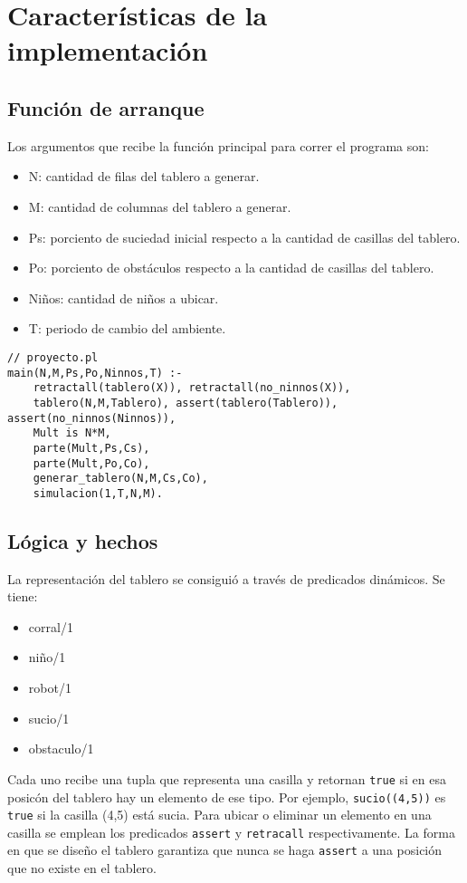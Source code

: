 \documentclass{llncs}
\begin{document}
\section{Caracter\'isticas de la implementaci\'on} 
\subsection{Funci\'on de arranque}

Los argumentos que recibe la funci\'on principal para correr el programa son:
\begin{itemize}
\item N: cantidad de filas del tablero a generar.
\item M: cantidad de columnas del tablero a generar.
\item Ps: porciento de suciedad inicial respecto a la cantidad de casillas del tablero.
\item Po: porciento de obst\'aculos respecto a la cantidad de casillas del tablero.
\item Ni\~nos: cantidad de ni\~nos a ubicar.
\item T: periodo de cambio del ambiente.
\end{itemize}

\begin{lstlisting}
// proyecto.pl
main(N,M,Ps,Po,Ninnos,T) :-
    retractall(tablero(X)), retractall(no_ninnos(X)),
    tablero(N,M,Tablero), assert(tablero(Tablero)), assert(no_ninnos(Ninnos)),
    Mult is N*M,
    parte(Mult,Ps,Cs),
    parte(Mult,Po,Co),
    generar_tablero(N,M,Cs,Co),
    simulacion(1,T,N,M).
\end{lstlisting}

\subsection{L\'ogica y hechos}
La representaci\'on del tablero se consigui\'o a trav\'es de predicados din\'amicos.
Se tiene:
\begin{itemize}
\item corral/1
\item ni\~no/1
\item robot/1
\item sucio/1
\item obstaculo/1
\end{itemize}


Cada uno recibe una tupla que representa una casilla y retornan \texttt{true} si en esa posic\'on del tablero hay un elemento de ese tipo. Por ejemplo, \texttt{sucio((4,5))} es \texttt{true} si la casilla (4,5) est\'a sucia. Para ubicar o eliminar un elemento en una casilla se emplean los predicados \texttt{assert} y \texttt{retracall} respectivamente. 
La forma en que se dise\~no el tablero garantiza que nunca se haga \texttt{assert} a una posici\'on que no existe en el tablero.
\end{document}
